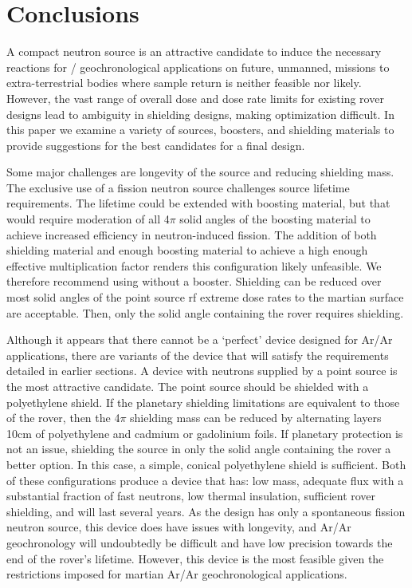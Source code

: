 \documentclass{mc2015}
\begin{document}
\section{Conclusions}
\label{sec:conclusions}

A compact neutron source is an attractive candidate to induce the necessary reactions for  /  geochronological applications on future, unmanned, missions to extra-terrestrial bodies where sample return is neither feasible nor likely. However, the vast range of overall dose and dose rate limits for existing rover designs lead to ambiguity in shielding designs, making optimization difficult. In this paper we examine a variety of sources, boosters, and shielding materials to provide suggestions for the best candidates for a final design.

Some major challenges are longevity of the source and reducing shielding mass. The  exclusive use of a  fission neutron source challenges source lifetime requirements. The lifetime could be extended with boosting material, but that would require moderation of all 4$\pi$ solid angles of the boosting material to achieve increased efficiency in neutron-induced fission. The addition of both shielding material and enough boosting material to achieve a high enough effective multiplication factor renders this configuration likely unfeasible. We therefore recommend using  without a booster. Shielding can be reduced over most solid angles of the point source rf extreme dose rates to the martian surface are acceptable. Then, only the solid angle containing the rover requires shielding. 

Although it appears that there cannot be a `perfect' device designed for Ar/Ar applications, there are variants of the device that will satisfy the requirements detailed in earlier sections. A device with neutrons supplied by a  point source is the most attractive candidate. The point source should be shielded with a polyethylene shield. If the planetary shielding limitations are equivalent to those of the rover, then the 4$\pi$ shielding mass can be reduced by alternating layers 10cm of polyethylene and cadmium or gadolinium foils. If planetary protection is not an issue, shielding the source in only the solid angle containing the rover a better option. In this case, a simple, conical polyethylene shield is sufficient. Both of these configurations produce a device that has: low mass, adequate flux with a substantial fraction of fast neutrons, low thermal insulation, sufficient rover shielding, and will last several years. As the design has only a spontaneous fission neutron source, this device does have issues with longevity, and Ar/Ar geochronology will undoubtedly be difficult and have low precision towards the end of the rover's lifetime. However, this device is the most feasible given the restrictions imposed for martian Ar/Ar geochronological applications. 
 
\end{document}
